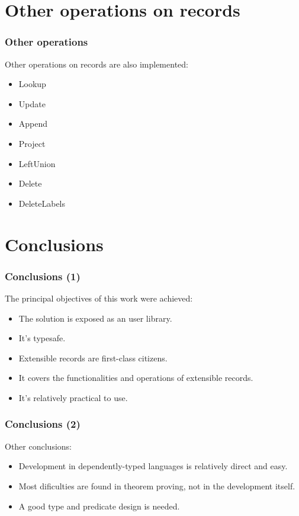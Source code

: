 \documentclass{beamer}
\begin{document}
\section{Other operations on records}

\begin{frame}[fragile]
\frametitle{Other operations}

Other operations on records are also implemented:

\begin{itemize}
\item Lookup
\item Update
\item Append
\item Project
\item LeftUnion
\item Delete
\item DeleteLabels
\end{itemize}
\end{frame}

\section{Conclusions}

\begin{frame}
\frametitle{Conclusions (1)}

The principal objectives of this work were achieved:

\begin{itemize}
\item The solution is exposed as an user library.
\item It's typesafe.
\item Extensible records are first-class citizens.
\item It covers the functionalities and operations of extensible records.
\item It's relatively practical to use.
\end{itemize}

\end{frame}

\begin{frame}
\frametitle{Conclusions (2)}

Other conclusions:

\begin{itemize}
\item Development in dependently-typed languages is relatively direct and easy.
\item Most dificulties are found in theorem proving, not in the development itself.
\item A good type and predicate design is needed.
\end{itemize}

\end{frame}
\end{document}
